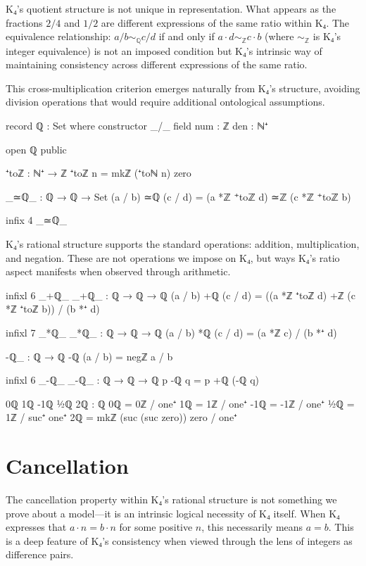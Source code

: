 \documentclass[11pt,a4paper]{book}
\begin{document}
K₄'s quotient structure is not unique in representation. What appears as the fractions $2/4$ and $1/2$ are different expressions of the same ratio within K₄. The equivalence relationship: $a/b \sim_{\mathbb{Q}} c/d$ if and only if $a \cdot d \sim_{\mathbb{Z}} c \cdot b$ (where $\sim_{\mathbb{Z}}$ is K₄'s integer equivalence) is not an imposed condition but K₄'s intrinsic way of maintaining consistency across different expressions of the same ratio.

This cross-multiplication criterion emerges naturally from K₄'s structure, avoiding division operations that would require additional ontological assumptions.

\begin{code}
record ℚ : Set where
  constructor _/_
  field
    num : ℤ
    den : ℕ⁺

open ℚ public

⁺toℤ : ℕ⁺ → ℤ
⁺toℤ n = mkℤ (⁺toℕ n) zero

_≃ℚ_ : ℚ → ℚ → Set
(a / b) ≃ℚ (c / d) = (a *ℤ ⁺toℤ d) ≃ℤ (c *ℤ ⁺toℤ b)

infix 4 _≃ℚ_
\end{code}

K₄'s rational structure supports the standard operations: addition, multiplication, and negation. These are not operations we impose on K₄, but ways K₄'s ratio aspect manifests when observed through arithmetic.

\begin{code}
infixl 6 _+ℚ_
_+ℚ_ : ℚ → ℚ → ℚ
(a / b) +ℚ (c / d) = ((a *ℤ ⁺toℤ d) +ℤ (c *ℤ ⁺toℤ b)) / (b *⁺ d)

infixl 7 _*ℚ_
_*ℚ_ : ℚ → ℚ → ℚ
(a / b) *ℚ (c / d) = (a *ℤ c) / (b *⁺ d)

-ℚ_ : ℚ → ℚ
-ℚ (a / b) = negℤ a / b

infixl 6 _-ℚ_
_-ℚ_ : ℚ → ℚ → ℚ
p -ℚ q = p +ℚ (-ℚ q)

0ℚ 1ℚ -1ℚ ½ℚ 2ℚ : ℚ
0ℚ  = 0ℤ / one⁺
1ℚ  = 1ℤ / one⁺
-1ℚ = -1ℤ / one⁺
½ℚ  = 1ℤ / suc⁺ one⁺
2ℚ  = mkℤ (suc (suc zero)) zero / one⁺
\end{code}

\section{Cancellation}

The cancellation property within K₄'s rational structure is not something we prove about a model—it is an intrinsic logical necessity of K₄ itself. When K₄ expresses that $a \cdot n = b \cdot n$ for some positive $n$, this necessarily means $a = b$. This is a deep feature of K₄'s consistency when viewed through the lens of integers as difference pairs.
\end{document}
